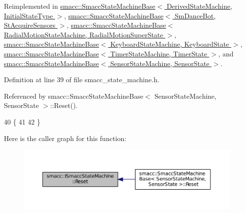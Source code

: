 Reimplemented in \hyperlink{structsmacc_1_1SmaccStateMachineBase_a2a99445921298d807eacc7a930a3cb5b}{smacc\+::\+Smacc\+State\+Machine\+Base$<$ Derived\+State\+Machine, Initial\+State\+Type $>$}, \hyperlink{structsmacc_1_1SmaccStateMachineBase_a2a99445921298d807eacc7a930a3cb5b}{smacc\+::\+Smacc\+State\+Machine\+Base$<$ Sm\+Dance\+Bot, St\+Acquire\+Sensors $>$}, \hyperlink{structsmacc_1_1SmaccStateMachineBase_a2a99445921298d807eacc7a930a3cb5b}{smacc\+::\+Smacc\+State\+Machine\+Base$<$ Radial\+Motion\+State\+Machine, Radial\+Motion\+Super\+State $>$}, \hyperlink{structsmacc_1_1SmaccStateMachineBase_a2a99445921298d807eacc7a930a3cb5b}{smacc\+::\+Smacc\+State\+Machine\+Base$<$ Keyboard\+State\+Machine, Keyboard\+State $>$}, \hyperlink{structsmacc_1_1SmaccStateMachineBase_a2a99445921298d807eacc7a930a3cb5b}{smacc\+::\+Smacc\+State\+Machine\+Base$<$ Timer\+State\+Machine, Timer\+State $>$}, and \hyperlink{structsmacc_1_1SmaccStateMachineBase_a2a99445921298d807eacc7a930a3cb5b}{smacc\+::\+Smacc\+State\+Machine\+Base$<$ Sensor\+State\+Machine, Sensor\+State $>$}.



Definition at line 39 of file smacc\+\_\+state\+\_\+machine.\+h.



Referenced by smacc\+::\+Smacc\+State\+Machine\+Base$<$ Sensor\+State\+Machine, Sensor\+State $>$\+::\+Reset().


\begin{DoxyCode}
40     \{
41 
42     \}
\end{DoxyCode}


Here is the caller graph for this function\+:
\nopagebreak
\begin{figure}[H]
\begin{center}
\leavevmode
\includegraphics[width=350pt]{classsmacc_1_1ISmaccStateMachine_a73d50cda0e1bee05812186bf57d6190e_icgraph}
\end{center}
\end{figure}


